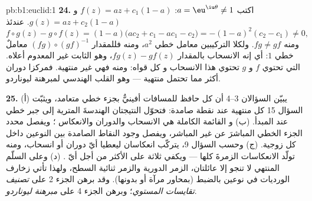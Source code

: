 \begin{solution}{pb:b1:euclid:1}
\textbf{24.} اكتب $a = \eu^{\iu\theta} \neq 1$: $f(z) = az +
c_1(1 - a)$ و $g(z) = az + c_2(1 - a)$. عندئذ
\[
f\circ g(z) - g\circ f(z)
= (1-a)\bigl(ac_2 + c_1 - ac_1 - c_2\bigr)
= -(1 - a)^2(c_2 - c_1) \neq 0 ,
\]
ومنه $f g \neq g f$. ولكلا التركيبين معامل خطي
$a^2$، ومنه فللمقدار $(fg)\circ(gf)^{-1}$ معاملٌ خطي $1$: أي إنه
الانسحاب بالمقدار $fg(z) - gf(z)$، وهو الثابت غير المعدوم أعلاه.
 التي تحتوي $f$ و $g$ تحتوي هذا الانسحاب و
كل قواه: ومنه فهي غير منتهية. فمركزا دوران أكثر مما
تحتمل  منتهية --- وهو القلب الهندسي لمبرهنة
ليوناردو.

\textbf{25.} (أ) يبيّن السؤالان 3--4 أن كل  حافظ
للمسافات أفينيٌّ بجزء خطي متعامد، ويثبّت السؤال 15
كل  منتهية عند نقطة صامدة: فتحوّل النتيجتان
الهندسةَ المترية إلى جبر خطي عند المبدأ. (ب) و
القائمة الكاملة هي الانسحاب والدوران والانعكاس ؛ ويفصل محدد الجزء الخطي المباشرَ
عن غير المباشر، ويفصل وجود النقاط الصامدة بين
النوعين داخل كل زوجية. (ج) وحسب السؤال 9، يتركّب
انعكاسان ليعطيا أيّ دوران أو انسحاب، ومنه تولّد
الانعكاسات الزمرةَ كلها --- ويكفي ثلاثة على الأكثر
من أجل أيّ . (د) وعلى السلّم المنتهي لا تنجو إلا عائلتان،
الزمر الدورية والزمر ثنائية السطح، ولهذا تأتي زخارف
الورديات في نوعين بالضبط (بمحاور مرآة أو بدونها).
وقد برهن الجزء 2 على \emph{تصنيف تقايسات
المستوي}؛ وبرهن الجزء 4 على \emph{مبرهنة ليوناردو}.
\end{solution}
